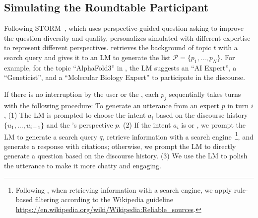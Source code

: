 \documentclass[11pt]{article}
\begin{document}
\subsection{Simulating the Roundtable Participant}
\label{sec:simulate_participant}
Following STORM~\citep{shao2024assisting}, which uses perspective-guided question asking to improve the question diversity and quality, \system personalizes simulated \experts with different expertise to represent different perspectives. \system retrieves the background of topic $t$ with a search query and gives it to an LM to generate the \expert list $\mathcal{P}=\{p_1, ..., p_N\}$. For example, for the topic ``AlphaFold3'' in , the LM suggests an ``AI Expert'', a ``Geneticist'', and a ``Molecular Biology Expert'' to participate in the discourse.  


If there is no interruption by the user or the \moderator, each \expert $p_j$ sequentially takes turns with the following procedure: 
To generate an utterance from an expert $p$ in turn $i$, 
(1) The LM is prompted to choose the intent $a_i$ based on the discourse history $\{u_1, ..., u_{i-1}\}$ and the \expert's perspective $p$. (2) If  the intent $a_i$ is  or , we prompt the LM to generate a search query $q$, retrieve information with a search engine~\footnote{Following \citet{shao2024assisting}, when retrieving information with a search engine, we apply rule-based filtering according to the Wikipedia guideline \url{https://en.wikipedia.org/wiki/Wikipedia:Reliable_sources}.}, and  generate a response with citations; otherwise, we prompt the LM to directly generate a question based on the discourse history.  
(3) We use the LM to polish the utterance to make it more chatty and engaging.%
\end{document}
